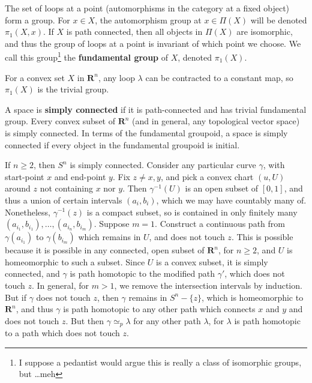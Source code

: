 The set of loops at a point (automorphisms in the category at a fixed object) form a group. For $x \in X$, the automorphism group at $x \in \Pi(X)$ will be denoted $\pi_1(X,x)$. If $X$ is path connected, then all objects in $\Pi(X)$ are isomorphic, and thus the group of loops at a point is invariant of which point we choose. We call this group\footnote{I suppose a pedantist would argue this is really a class of isomorphic groups, but \dots meh} the {\bf fundamental group} of $X$, denoted $\pi_1(X)$.

\begin{example}
    For a convex set $X$ in $\mathbf{R}^n$, any loop $\lambda$ can be contracted to a constant map, so $\pi_1(X)$ is the trivial group.
\end{example}

A space is {\bf simply connected} if it is path-connected and has trivial fundamental group. Every convex subset of $\mathbf{R}^n$ (and in general, any topological vector space) is simply connected. In terms of the fundamental groupoid, a space is simply connected if every object in the fundamental groupoid is initial.

\begin{example}
    If $n \geq 2$, then $S^n$ is simply connected. Consider any particular curve $\gamma$, with start-point $x$ and end-point $y$. Fix $z \neq x,y$, and pick a convex chart $(u,U)$ around $z$ not containing $x$ nor $y$. Then $\gamma^{-1}(U)$ is an open subset of $[0,1]$, and thus a union of certain intervals $(a_i,b_i)$, which we may have countably many of. Nonetheless, $\gamma^{-1}(z)$ is a compact subset, so is contained in only finitely many $(a_{i_1}, b_{i_1}), \dots, (a_{i_n}, b_{i_m})$. Suppose $m = 1$. Construct a continuous path from $\gamma(a_{i_1})$ to $\gamma(b_{i_m})$ which remains in $U$, and does not touch $z$. This is possible because it is possible in any connected, open subset of $\mathbf{R}^n$, for $n \geq 2$, and $U$ is homeomorphic to such a subset. Since $U$ is a convex subset, it is simply connected, and $\gamma$ is path homotopic to the modified path $\gamma'$, which does not touch $z$. In general, for $m > 1$, we remove the intersection intervals by induction. But if $\gamma$ does not touch $z$, then $\gamma$ remains in $S^n - \{ z \}$, which is homeomorphic to $\mathbf{R}^n$, and thus $\gamma$ is path homotopic to any other path which connects $x$ and $y$ and does not touch $z$. But then $\gamma \simeq_p \lambda$ for any other path $\lambda$, for $\lambda$ is path homotopic to a path which does not touch $z$.
\end{example}

